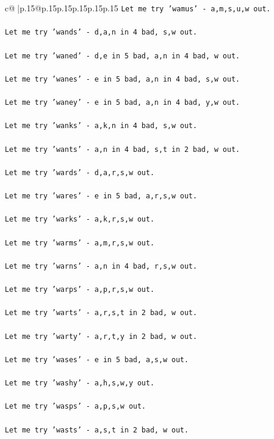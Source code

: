 \documentclass{article}
\begin{document}
{\begin{supertabular}{c@{$\;$}|p{.15\linewidth}@{}p{.15\linewidth}p{.15\linewidth}p{.15\linewidth}p{.15\linewidth}p{.15\linewidth}}
{{{\texttt{Let me try 'wamus' {-} a,m,s,u,w out. } \\
\\ 
\texttt{Let me try 'wands' {-} d,a,n in 4 bad, s,w out. } \\
\\ 
\texttt{Let me try 'waned' {-} d,e in 5 bad, a,n in 4 bad, w out. } \\
\\ 
\texttt{Let me try 'wanes' {-} e in 5 bad, a,n in 4 bad, s,w out. } \\
\\ 
\texttt{Let me try 'waney' {-} e in 5 bad, a,n in 4 bad, y,w out. } \\
\\ 
\texttt{Let me try 'wanks' {-} a,k,n in 4 bad, s,w out. } \\
\\ 
\texttt{Let me try 'wants' {-} a,n in 4 bad, s,t in 2 bad, w out. } \\
\\ 
\texttt{Let me try 'wards' {-} d,a,r,s,w out. } \\
\\ 
\texttt{Let me try 'wares' {-} e in 5 bad, a,r,s,w out. } \\
\\ 
\texttt{Let me try 'warks' {-} a,k,r,s,w out. } \\
\\ 
\texttt{Let me try 'warms' {-} a,m,r,s,w out. } \\
\\ 
\texttt{Let me try 'warns' {-} a,n in 4 bad, r,s,w out. } \\
\\ 
\texttt{Let me try 'warps' {-} a,p,r,s,w out. } \\
\\ 
\texttt{Let me try 'warts' {-} a,r,s,t in 2 bad, w out. } \\
\\ 
\texttt{Let me try 'warty' {-} a,r,t,y in 2 bad, w out. } \\
\\ 
\texttt{Let me try 'wases' {-} e in 5 bad, a,s,w out. } \\
\\ 
\texttt{Let me try 'washy' {-} a,h,s,w,y out. } \\
\\ 
\texttt{Let me try 'wasps' {-} a,p,s,w out. } \\
\\ 
\texttt{Let me try 'wasts' {-} a,s,t in 2 bad, w out. } \\
}}}
\end{supertabular}}
\end{document}
